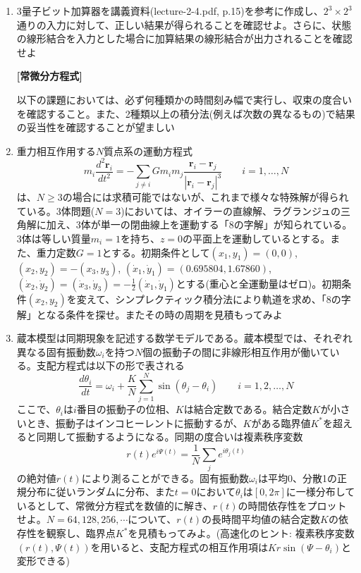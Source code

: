 \documentclass[11pt]{jarticle}
\begin{document}
\begin{enumerate}
\item 3量子ビット加算器を講義資料(lecture-2-4.pdf, p.15)を参考に作成し、$2^3 \times 2^3$通りの入力に対して、正しい結果が得られることを確認せよ。さらに、状態の線形結合を入力とした場合に加算結果の線形結合が出力されることを確認せよ

\hspace*{-2em} {\bf [常微分方程式]}

以下の課題においては、必ず何種類かの時間刻み幅で実行し、収束の度合いを確認すること。また、2種類以上の積分法(例えば次数の異なるもの)で結果の妥当性を確認することが望ましい

\item 重力相互作用する$N$質点系の運動方程式
  \[
  m_i \frac{d^2 \mathbf{r}_i}{dt^2} = - \sum_{j \ne i} G m_i m_j \frac{\mathbf{r}_i - \mathbf{r}_j}{|\mathbf{r}_i - \mathbf{r}_j|^3} \qquad i = 1,\ldots,N
  \]
  は、$N \ge 3$の場合には求積可能ではないが、これまで様々な特殊解が得られている。3体問題($N=3$)においては、オイラーの直線解、ラグランジュの三角解に加え、3体が単一の閉曲線上を運動する「8の字解」が知られている。3体は等しい質量$m_i=1$を持ち、$z=0$の平面上を運動しているとする。また、重力定数$G=1$とする。初期条件として$(x_1,y_1)=(0,0)$, $(x_2,y_2)=-(x_3,y_3)$, $(\dot{x}_1,\dot{y}_1)=(0.695804,1.67860)$, $(\dot{x}_2,\dot{y}_2)=(\dot{x}_3,\dot{y}_3)=-\frac{1}{2}(\dot{x}_1,\dot{y}_1)$とする(重心と全運動量はゼロ)。初期条件$(x_2,y_2)$を変えて、シンプレクティック積分法により軌道を求め、「8の字解」となる条件を探せ。またその時の周期を見積もってみよ
  \begin{center}
  \end{center}
  
\item 蔵本模型は同期現象を記述する数学モデルである。蔵本模型では、それぞれ異なる固有振動数$\omega_i$を持つ$N$個の振動子の間に非線形相互作用が働いている。支配方程式は以下の形で表される
  \[
  \frac{d\theta_i}{dt} = \omega_i + \frac{K}{N} \sum_{j=1}^N \sin(\theta_j - \theta_i) \qquad i=1,2,\ldots,N
  \]
  ここで、$\theta_i$は$i$番目の振動子の位相、$K$は結合定数である。結合定数$K$が小さいとき、振動子はインコヒーレントに振動するが、$K$がある臨界値$K^*$を超えると同期して振動するようになる。同期の度合いは複素秩序変数
  \[
  r(t) e^{i\Psi(t)} = \frac{1}{N} \sum_j e^{i\theta_j(t)}
  \]
  の絶対値$r(t)$により測ることができる。固有振動数$\omega_i$は平均0、分散1の正規分布に従いランダムに分布、また$t=0$において$\theta_i$は$[0,2\pi]$に一様分布しているとして、常微分方程式を数値的に解き、$r(t)$の時間依存性をプロットせよ。$N=64,128,256,\cdots$について、$r(t)$の長時間平均値の結合定数$K$の依存性を観察し、臨界点$K^*$を見積もってみよ。(高速化のヒント: 複素秩序変数$(r(t),\Psi(t))$を用いると、支配方程式の相互作用項は$K r \sin(\Psi-\theta_i)$と変形できる)


\end{enumerate}
\end{document}
